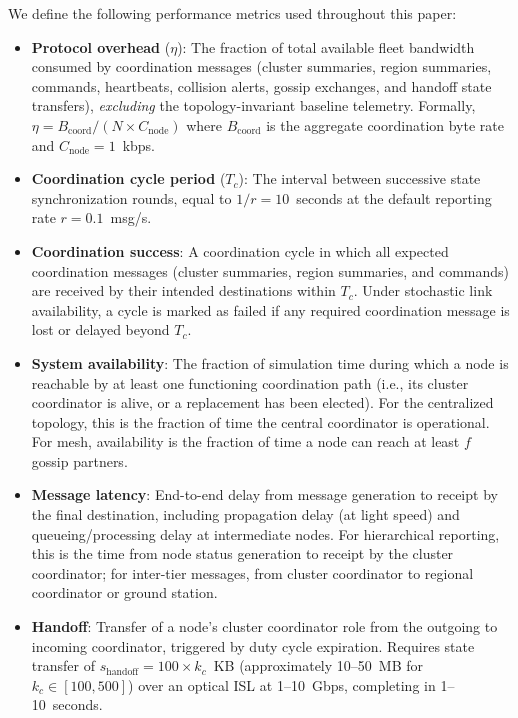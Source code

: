 \documentclass[journal]{IEEEtran}
\begin{document}
We define the following performance metrics used throughout this paper:

\begin{itemize}
    \item \textbf{Protocol overhead} ($\eta$): The fraction of total available fleet bandwidth consumed by coordination messages (cluster summaries, region summaries, commands, heartbeats, collision alerts, gossip exchanges, and handoff state transfers), \emph{excluding} the topology-invariant baseline telemetry. Formally, $\eta = B_{\text{coord}} / (N \times C_{\text{node}})$ where $B_{\text{coord}}$ is the aggregate coordination byte rate and $C_{\text{node}} = 1$~kbps.

    \item \textbf{Coordination cycle period} ($T_c$): The interval between successive state synchronization rounds, equal to $1/r = 10$~seconds at the default reporting rate $r = 0.1$~msg/s.

    \item \textbf{Coordination success}: A coordination cycle in which all expected coordination messages (cluster summaries, region summaries, and commands) are received by their intended destinations within $T_c$. Under stochastic link availability, a cycle is marked as failed if any required coordination message is lost or delayed beyond $T_c$.

    \item \textbf{System availability}: The fraction of simulation time during which a node is reachable by at least one functioning coordination path (i.e., its cluster coordinator is alive, or a replacement has been elected). For the centralized topology, this is the fraction of time the central coordinator is operational. For mesh, availability is the fraction of time a node can reach at least $f$ gossip partners.

    \item \textbf{Message latency}: End-to-end delay from message generation to receipt by the final destination, including propagation delay (at light speed) and queueing/processing delay at intermediate nodes. For hierarchical reporting, this is the time from node status generation to receipt by the cluster coordinator; for inter-tier messages, from cluster coordinator to regional coordinator or ground station.

    \item \textbf{Handoff}: Transfer of a node's cluster coordinator role from the outgoing to incoming coordinator, triggered by duty cycle expiration. Requires state transfer of $s_{\text{handoff}} = 100 \times k_c$~KB (approximately 10--50~MB for $k_c \in [100, 500]$) over an optical ISL at 1--10~Gbps, completing in 1--10~seconds.
\end{itemize}
\end{document}
